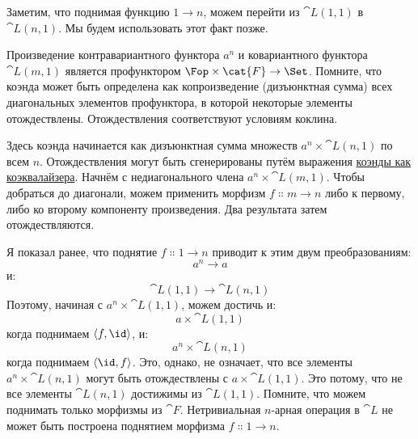 \begin{figure}[H]
  \centering
\end{figure}

\noindent
Заметим, что поднимая функцию $1 \to n$, можем перейти
из $\cat{L}(1, 1)$ в $\cat{L}(n, 1)$. Мы будем использовать этот факт
позже.

Произведение контравариантного функтора $a^n$ и ковариантного
функтора $\cat{L}(m, 1)$ является профунктором
$\Fop \times \cat{F} \to \Set$. Помните, что коэнда может быть определена
как копроизведение (дизъюнктная сумма) всех диагональных элементов
профунктора, в которой некоторые элементы отождествлены. Отождествления
соответствуют условиям коклина.

Здесь коэнда начинается как дизъюнктная сумма множеств
$a^n \times \cat{L}(n, 1)$ по всем $n$. Отождествления могут
быть сгенерированы путём выражения
\hyperref[ends-and-coends]{коэнды как
  коэквалайзера}. Начнём с недиагонального члена
$a^n \times \cat{L}(m, 1)$. Чтобы добраться до диагонали, можем применить
морфизм $f \Colon m \to n$ либо к первому, либо
ко второму компоненту произведения. Два результата затем
отождествляются.

\begin{figure}[H]
  \centering
\end{figure}

\noindent
Я показал ранее, что поднятие
$f \Colon 1 \to n$ приводит к этим двум
преобразованиям:
\[a^n \to a\]
и:
\[\cat{L}(1, 1) \to \cat{L}(n, 1)\]
Поэтому, начиная с $a^n \times \cat{L}(1, 1)$, можем достичь и:
\[a \times \cat{L}(1, 1)\]
когда поднимаем $\langle f, \id \rangle$, и:
\[a^n \times \cat{L}(n, 1)\]
когда поднимаем $\langle \id, f \rangle$. Это, однако, не
означает, что все элементы $a^n \times \cat{L}(n, 1)$ могут быть
отождествлены с $a \times \cat{L}(1, 1)$. Это потому, что не все элементы
$\cat{L}(n, 1)$ достижимы из $\cat{L}(1, 1)$. Помните,
что можем поднимать только морфизмы из $\cat{F}$. Нетривиальная $n$-арная
операция в $\cat{L}$ не может быть построена поднятием морфизма
$f \Colon 1 \to n$.

